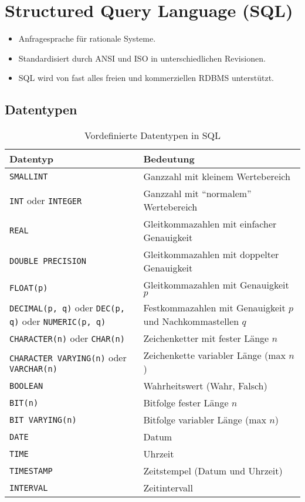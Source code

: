 \documentclass[a4paper, 11pt, accentcolor = tud3b]{tudreport}
\begin{document}
        \section{Structured Query Language (SQL)} %
        	\begin{itemize}
        		\item Anfragesprache für rationale Systeme.
        		\item Standardisiert durch ANSI und ISO in unterschiedlichen Revisionen.
        		\item SQL wird von fast alles freien und kommerziellen RDBMS unterstützt.
        	\end{itemize}

            \subsection{Datentypen} %
                \begin{table}[H]
                	\centering
                	\begin{tabular}{l | l}
                		Datentyp & Bedeutung \\ \hline
                		\lstinline|SMALLINT| & Ganzzahl mit kleinem Wertebereich \\
                		\lstinline|INT| oder \lstinline|INTEGER| & Ganzzahl mit \enquote{normalem} Wertebereich \\
                		\lstinline|REAL| & Gleitkommazahlen mit einfacher Genauigkeit \\
                		\lstinline|DOUBLE PRECISION| & Gleitkommazahlen mit doppelter Genauigkeit \\
                		\lstinline|FLOAT(p)| & Gleitkommazahlen mit Genauigkeit \(p\) \\
                		\lstinline|DECIMAL(p, q)| oder \lstinline|DEC(p, q)| oder \lstinline|NUMERIC(p, q)| & Festkommazahlen mit Genauigkeit \(p\) und Nachkommastellen \(q\) \\
                		\lstinline|CHARACTER(n)| oder \lstinline|CHAR(n)| & Zeichenketter mit fester Länge \(n\) \\
                		\lstinline|CHARACTER VARYING(n)| oder \lstinline|VARCHAR(n)| & Zeichenkette variabler Länge (max \(n\)) \\
                		\lstinline|BOOLEAN| & Wahrheitswert (Wahr, Falsch) \\
                		\lstinline|BIT(n)| & Bitfolge fester Länge \(n\) \\
                		\lstinline|BIT VARYING(n)| & Bitfolge variabler Länge (max \(n\)) \\
                		\lstinline|DATE| & Datum \\
                		\lstinline|TIME| & Uhrzeit \\
                		\lstinline|TIMESTAMP| & Zeitstempel (Datum und Uhrzeit) \\
                		\lstinline|INTERVAL| & Zeitintervall
                	\end{tabular}
                	\caption{Vordefinierte Datentypen in SQL}
                \end{table}
\end{document}
